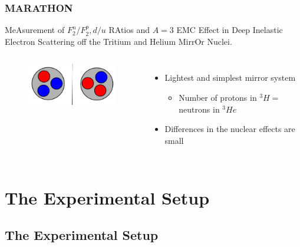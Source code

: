 \documentclass[12pt,usenames,dvipsnames]{beamer}
\begin{document}
\begin{frame}
\frametitle{MARATHON}
\vspace{-10pt}
\begin{block}{}
MeAsurement of $F^n_2/F^p_2, d/u$ RAtios and $A=3$ EMC Effect in Deep Inelastic Electron Scattering off the Tritium and Helium MirrOr Nuclei.
\vspace{-10pt}
\begin{columns}[t]
	
	\vspace{-10pt}	
	\hspace{-10pt}
	\begin{figure}
		\includegraphics[width =5cm]{../images/mirror}
	\end{figure}
	
	\vspace{10pt}
	\begin{itemize}
		\item Lightest and simplest mirror system
		\begin{itemize}
			\item  Number of protons in $^3H =$ neutrons in $^3He$
		\end{itemize}
		\item Differences in the nuclear effects are small
	\end{itemize}
	
	
\end{columns}
\end{block}
\end{frame}

\section[Experiment]{The Experimental Setup}
\subsection[Equipment]{The Experimental Setup}
\end{document}
